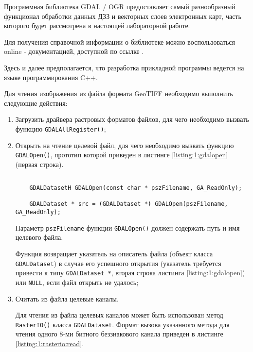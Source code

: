 
Программная библиотека GDAL / OGR предоставляет самый разнообразный функционал обработки данных ДЗЗ и векторных слоев электронных карт, часть которого будет рассмотрена в настоящей лабораторной работе.

Для получения справочной информации о библиотеке можно воспользоваться online - документацией, доступной по ссылке \cite{gdal-ogr}.

Здесь и далее предполагается, что разработка прикладной программы ведется на языке программирования C++.

Для чтения изображения из файла формата GeoTIFF необходимо выполнить следующие действия:

\begin{enumerate}

	\item Загрузить драйвера растровых форматов файлов, для чего необходимо вызвать функцию \verb|GDALAllRegister()|;
	\item Открыть на чтение целевой файл, для чего необходимо вызвать функцию \verb|GDALOpen()|, прототип которой приведен в листинге \ref{listing:1:gdalopen} (первая строка).

	\begin{lstlisting}

	GDALDatasetH GDALOpen(const char * pszFilename, GA_ReadOnly);

	GDALDataset * src = (GDALDataset *) GDALOpen(pszFilename, GA_ReadOnly);

	\end{lstlisting}
	\mylistingend

	Параметр \verb|pszFilename| функции \verb|GDALOpen()| должен содержать путь и имя целевого файла.

	Функция возвращает указатель на описатель файла (объект класса \verb|GDALDataset|) в случае его успешного открытия (указатель требуется привести к типу \verb|GDALDataset *|, вторая строка листинга \ref{listing:1:gdalopen}) или \verb|NULL|, если файл открыть не удалось;

	\item Считать из файла целевые каналы.

	Для чтения из файла целевых каналов может быть использован метод \verb|RasterIO()| класса \verb|GDALDataset|. Формат вызова указанного метода для чтения одного 8-ми битного беззнакового канала приведен в листинге \ref{listing:1:rasterio:read}.


\end{enumerate}
